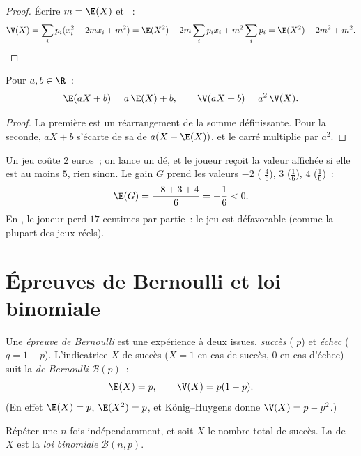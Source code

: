 \begin{proof}
Écrire $m = \E(X)$ et ~:
\[
\V(X) = \sum_i p_i (x_i^2 - 2m x_i + m^2)
= \E(X^2) - 2m\sum_i p_i x_i + m^2\sum_i p_i
= \E(X^2) - 2m^2 + m^2 . \qedhere
\]
\end{proof}

\begin{proposition}\label{prop:g12:randvar:affine}
Pour $a, b \in \R$~:
\[
\E(aX + b) = a\,\E(X) + b, \qquad
\V(aX + b) = a^2\,\V(X) .
\]
\end{proposition}

\begin{proof}
La première est un réarrangement de la somme définissante. Pour la seconde,
$aX + b$ s'écarte de sa  de $a(X - \E(X))$, et le carré multiplie par
$a^2$.
\end{proof}

\begin{example}\label{ex:g12:randvar:game}
Un jeu coûte $2$ euros~; on lance un dé, et le joueur reçoit la valeur
affichée si elle est au moins $5$, rien sinon. Le gain $G$ prend les valeurs
$-2$ ( $\frac46$), $3$ ($\frac16$), $4$ ($\frac16$)~:
\[
\E(G) = \frac{-8 + 3 + 4}{6} = -\frac{1}{6} < 0 .
\]
En , le joueur perd $17$ centimes par partie~: le jeu est défavorable
(comme la plupart des jeux réels).
\end{example}

\section{Épreuves de Bernoulli et loi binomiale}

\begin{definition}\label{def:g12:randvar:bernoulli}
Une \emph{épreuve de Bernoulli} est une
expérience à deux issues, \emph{succès} ( $p$) et
\emph{échec} ($q = 1 - p$). L'indicatrice $X$ de succès ($X = 1$ en cas de
succès, $0$ en cas d'échec) suit la \emph{ de Bernoulli}
$\mathcal B(p)$~:
\[
\E(X) = p, \qquad \V(X) = p(1-p) .
\]
(En effet $\E(X) = p$, $\E(X^2) = p$, et König--Huygens donne
$\V(X) = p - p^2$.)
\end{definition}

\begin{definition}\label{def:g12:randvar:binomial}
Répéter une  $n$ fois indépendamment, et soit $X$ le
nombre total de succès. La  de $X$ est la \emph{loi
binomiale} $\mathcal B(n, p)$.
\end{definition}

